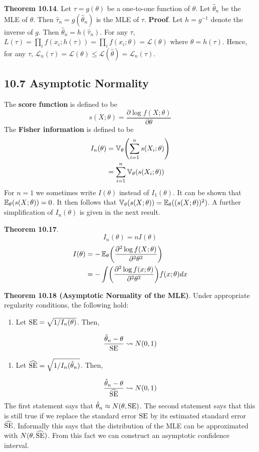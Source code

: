 \textbf{Theorem 10.14}. Let \(\tau = g(\theta)\) be a one-to-one
function of \(\theta\). Let \(\hat{\theta}_{n}\) be the MLE of \(\theta\).
Then \(\hat{\tau}_{n} = g(\hat{\theta}_{n})\) is the MLE of \(\tau\).
\textbf{Proof}. Let \(h = g^{-1}\) denote the inverse of \(g\). Then
\(\hat{\theta}_{n} = h(\hat{\tau}_{n})\). For any \(\tau\),
\(L(\tau) = \prod_{i} f(x_{i}; h(\tau)) = \prod_{i} f(x_{i}; \theta) = \mathcal{L}(\theta)\)
where \(\theta = h(\tau)\). Hence, for any \(\tau\),
\(\mathcal{L}_{n}(\tau) = \mathcal{L}(\theta) \leq \mathcal{L}(\hat{\theta}) = \mathcal{L}_{n}(\hat{\tau})\).

\subsection*{10.7 Asymptotic Normality}\label{asymptotic-normality}
The \textbf{score function} is defined to be
\[
s(X; \theta) = \frac{\partial \log f(X; \theta)}{\partial \theta}
\]
The \textbf{Fisher information} is defined to be
\begin{align*}
I_{n}(\theta) &= \VAR_\theta \left( \sum_{i=1}^{n} s(X_{i}; \theta) \right) \\
&= \sum_{i=1}^{n} \VAR_\theta(s(X_{i}; \theta))
\end{align*}
For \(n = 1\) we sometimes write \(I(\theta)\) instead of
\(I_{1}(\theta)\).
It can be shown that \(\operatorname{\mathbb{E}}_{\theta}(s(X; \theta)) = 0\). It then
follows that
\(\operatorname{\mathbb{V}}_\theta(s(X; \theta)) = \operatorname{\mathbb{E}}_{\theta}((s(X; \theta))^{2})\).
A further simplification of \(I_{n}(\theta)\) is given in the next result.

\textbf{Theorem 10.17}.
\[
I_{n}(\theta) = n I(\theta)
\]
\begin{align*}
I(\theta) & = -\EXP_{\theta} \left( \frac{\partial^{2} \log f(X; \theta)}{\partial^{2} \theta^{2}} \right) \\
&= - \int \left( \frac{\partial^{2} \log f(x; \theta)}{\partial^{2} \theta^{2}} \right) f(x; \theta) dx
\end{align*}

\textbf{Theorem 10.18 (Asymptotic Normality of the MLE)}. Under
appropriate regularity conditions, the following hold:
\begin{enumerate}[tightlist,label={\arabic*.}]
\item
  Let \(\operatorname{\mathrm{SE}} = \sqrt{1 / I_{n}(\theta)}\). Then,
\end{enumerate}
\[
\frac{\hat{\theta}_{n} - \theta}{\operatorname{\mathrm{SE}} } \leadsto N(0, 1)
\]
\begin{enumerate}[tightlist,label={\arabic*.}]
\item
  Let \(\widehat{\operatorname{\mathrm{SE}}} = \sqrt{1 / I_{n}(\hat{\theta}_{n})}\). Then,
\end{enumerate}
\[
\frac{\hat{\theta}_{n} - \theta}{\widehat{\operatorname{\mathrm{SE}}}} \leadsto N(0, 1)
\]
The first statement says that
\(\hat{\theta}_{n} \approx N(\theta, \operatorname{\mathrm{SE}} )\). The second statement
says that this is still true if we replace the standard error
\(\operatorname{\mathrm{SE}} \) by its estimated standard error \(\widehat{\operatorname{\mathrm{SE}}}\).
Informally this says that the distribution of the MLE can be
approximated with \(N(\theta, \widehat{\operatorname{\mathrm{SE}}})\). From this fact we can
construct an asymptotic confidence interval.

